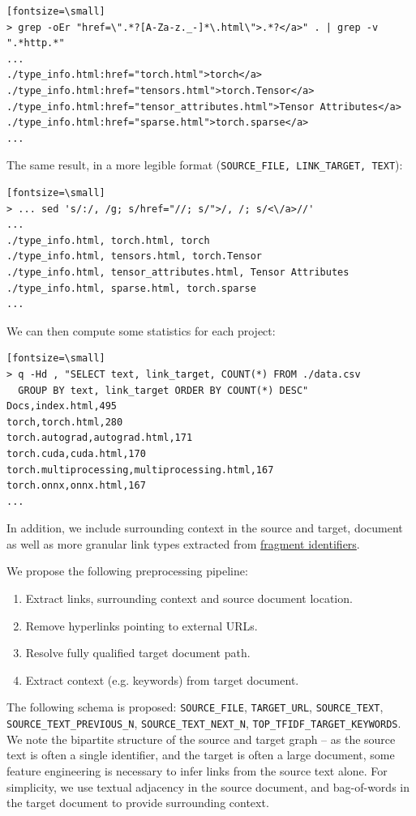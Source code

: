 \documentclass{article}
\begin{document}
\begin{verbatim}[fontsize=\small]
> grep -oEr "href=\".*?[A-Za-z._-]*\.html\">.*?</a>" . | grep -v ".*http.*"
...
./type_info.html:href="torch.html">torch</a>
./type_info.html:href="tensors.html">torch.Tensor</a>
./type_info.html:href="tensor_attributes.html">Tensor Attributes</a>
./type_info.html:href="sparse.html">torch.sparse</a>
...
\end{verbatim}

The same result, in a more legible format (\texttt{SOURCE\_FILE, LINK\_TARGET, TEXT}):

\begin{verbatim}[fontsize=\small]
> ... sed 's/:/, /g; s/href="//; s/">/, /; s/<\/a>//'
...
./type_info.html, torch.html, torch
./type_info.html, tensors.html, torch.Tensor
./type_info.html, tensor_attributes.html, Tensor Attributes
./type_info.html, sparse.html, torch.sparse
...
\end{verbatim}

We can then compute some statistics for each project:

\begin{verbatim}[fontsize=\small]
> q -Hd , "SELECT text, link_target, COUNT(*) FROM ./data.csv 
  GROUP BY text, link_target ORDER BY COUNT(*) DESC"
Docs,index.html,495
torch,torch.html,280
torch.autograd,autograd.html,171
torch.cuda,cuda.html,170
torch.multiprocessing,multiprocessing.html,167
torch.onnx,onnx.html,167
...
\end{verbatim}

In addition, we include surrounding context in the source and target, document as well as more granular link types extracted from \href{https://en.wikipedia.org/wiki/Fragment_identifier}{fragment identifiers}.

We propose the following preprocessing pipeline:

\begin{enumerate}
    \item Extract links, surrounding context and source document location.
    \item Remove hyperlinks pointing to external URLs.
    \item Resolve fully qualified target document path.
    \item Extract context (e.g. keywords) from target document.
\end{enumerate}

The following schema is proposed: \texttt{SOURCE\_FILE}, \texttt{TARGET\_URL}, \texttt{SOURCE\_TEXT}, \texttt{SOURCE\_TEXT\_PREVIOUS\_N}, \texttt{SOURCE\_TEXT\_NEXT\_N}, \texttt{TOP\_TFIDF\_TARGET\_KEYWORDS}. We note the bipartite structure of the source and target graph -- as the source text is often a single identifier, and the target is often a large document, some feature engineering is necessary to infer links from the source text alone. For simplicity, we use textual adjacency in the source document, and bag-of-words in the target document to provide surrounding context.
\end{document}
